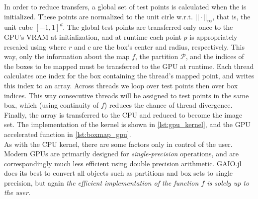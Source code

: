 In order to reduce transfers, a global set of test points is calculated when the 
 is initialized. These points are normalized to the unit cirle w.r.t. 
$|| \cdot ||_\infty$, that is, the unit cube $[-1,1]^d$. The global test points are 
transferred only once to the GPU's VRAM at initialization, and at runtime each point $p$ 
is appropriately rescaled using  where $r$ and $c$ are the 
box's center and radius, respectively. This way, only the information about the 
map $f$, the partition $\mathcal{P}$, and the indices of the boxes to be mapped must be 
transferred to the GPU at runtime. Each thread calculates one index for the box containing 
the thread's mapped point, and writes this index to an array. 
Across threads we loop over test points then over box indices. This way consecutive 
threads will be assigned to test points in the same box, which (using continuity of $f$) 
reduces the chance of thread divergence. Finally, the array is 
transferred to the CPU and reduced to become the image set. The implementation of the 
kernel is shown in \autoref{lst:gpu_kernel}, and the GPU accelerated 
function in \autoref{lst:boxmap_gpu}. \\

As with the CPU kernel, there are some factors only in control of the user. Modern GPUs 
are primarily designed for \emph{single-precision} operations, and are correspondingly 
much less efficient using double precision arithmetic. GAIO.jl does its best to convert 
all objects such as partitions and box sets to single precision, but again \emph{
the efficient implementation of the function $f$ is solely up to the user.
}

